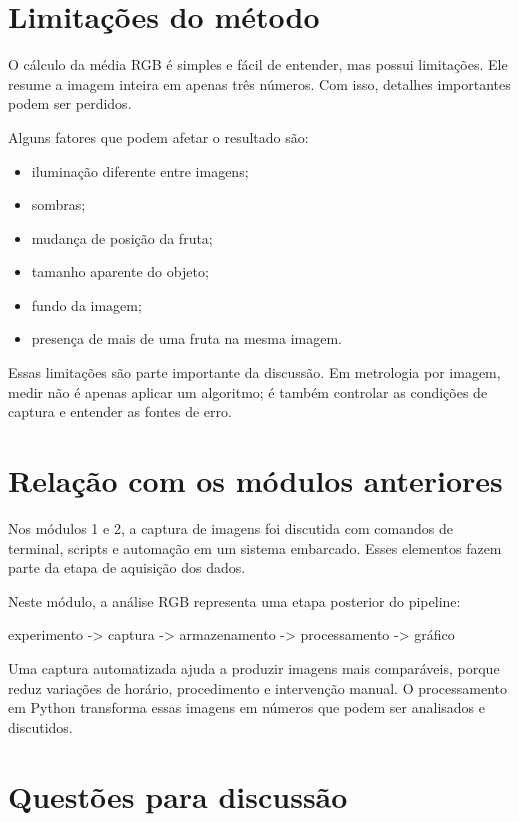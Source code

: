 \documentclass[12pt]{article}
\begin{document}
\section{Limitações do método}

O cálculo da média RGB é simples e fácil de entender, mas possui limitações. Ele resume a imagem inteira em apenas três números. Com isso, detalhes importantes podem ser perdidos.

Alguns fatores que podem afetar o resultado são:

\begin{itemize}
  \item iluminação diferente entre imagens;
  \item sombras;
  \item mudança de posição da fruta;
  \item tamanho aparente do objeto;
  \item fundo da imagem;
  \item presença de mais de uma fruta na mesma imagem.
\end{itemize}

Essas limitações são parte importante da discussão. Em metrologia por imagem, medir não é apenas aplicar um algoritmo; é também controlar as condições de captura e entender as fontes de erro.

\section{Relação com os módulos anteriores}

Nos módulos 1 e 2, a captura de imagens foi discutida com comandos de terminal, scripts e automação em um sistema embarcado. Esses elementos fazem parte da etapa de aquisição dos dados.

Neste módulo, a análise RGB representa uma etapa posterior do pipeline:

\begin{codebox}
experimento -> captura -> armazenamento -> processamento -> gráfico
\end{codebox}

Uma captura automatizada ajuda a produzir imagens mais comparáveis, porque reduz variações de horário, procedimento e intervenção manual. O processamento em Python transforma essas imagens em números que podem ser analisados e discutidos.

\section{Questões para discussão}
\end{document}
